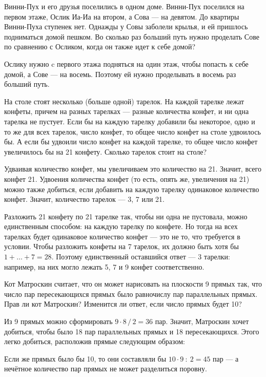 

\begin{itemize}

	\itA Винни-Пух и его друзья поселились в одном доме. Винни-Пух поселился на первом этаже, Ослик Иа-Иа на втором, а Сова — на девятом. До квартиры Винни-Пуха ступенек нет. Однажды у Совы заболели крылья, и ей пришлось подниматься домой пешком. Во сколько раз больший путь нужно проделать Сове по сравнению с Осликом, когда он также идет к себе домой?
	
	\itr Ослику нужно c первого этажа подняться на один этаж, чтобы попасть к себе домой, а Сове — на восемь. Поэтому ей нужно проделывать в восемь раз больший путь.

	\itB На столе стоят несколько (больше одной) тарелок. На каждой тарелке лежат конфеты, причем на разных тарелках — разные количества конфет, и ни одна тарелка не пустует. Если бы на каждую тарелку добавили бы некоторое, одно и то же для всех тарелок, число конфет, то общее число конфет на столе удвоилось бы. А если бы удвоили число конфет на каждой тарелке, то общее число конфет увеличилось бы на 21 конфету. Сколько тарелок стоит на столе?
	
	\itr Удваивая количество конфет, мы увеличиваем это количество на 21. Значит, всего конфет 21. Удвоения количества конфет (то есть, опять же, увеличения на 21) можно также добиться, если добавить на каждую тарелку одинаковое количество конфет. Значит, количество тарелок — 3, 7 или 21.
	
	Разложить 21 конфету по 21 тарелке так, чтобы ни одна не пустовала, можно единственным способом: на каждую тарелку по конфете. Но тогда на всех тарелках будет одинаковое количество конфет — это не то, что требуется в условии. Чтобы разложить конфеты на 7 тарелок, их должно быть хотя бы $1 + \ldots + 7 = 28$. Поэтому единственный оставшийся ответ — 3 тарелки: например, на них могло лежать 5, 7 и 9 конфет соответственно.

	\itC Кот Матроскин считает, что он может нарисовать на плоскости 9 прямых так, что число пар пересекающихся прямых было равно\linebreak числу пар параллельных прямых. Прав ли кот Матроскин? Изменится ли ответ, если число прямых будет 10?

	\itr Из 9 прямых можно сформировать $9 \cdot 8\,/\,2 = 36$ пар. Значит, Матроскин хочет добиться, чтобы было 18 пар параллельных прямых и 18 пересекающихся. Этого легко добиться, расположив прямые следующим образом:
	
	\begin{center}  \end{center}
	
	Если же прямых было бы 10, то они составляли бы $10 \cdot 9\ :\ 2 = 45$ пар — а нечётное количество пар прямых не может разделиться поровну.

\end{itemize}

